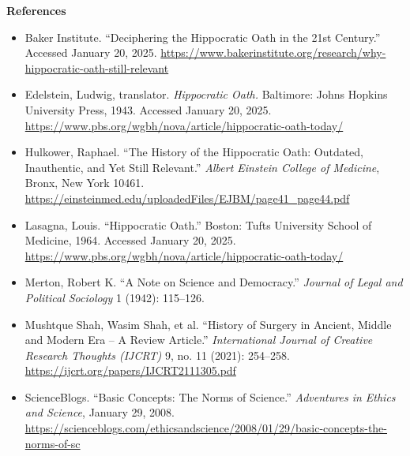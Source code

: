 \documentclass[12pt]{article}
\begin{document}
\bigskip
\begin{center}
\textbf{References}
\end{center}

\begin{itemize}
    \setlength\itemsep{0.5em}
    \item Baker Institute. ``Deciphering the Hippocratic Oath in the 21st Century.'' Accessed January 20, 2025. 
    \url{https://www.bakerinstitute.org/research/why-hippocratic-oath-still-relevant}

    \item Edelstein, Ludwig, translator. \textit{Hippocratic Oath.} Baltimore: Johns Hopkins University Press, 1943. 
    Accessed January 20, 2025. 
    \url{https://www.pbs.org/wgbh/nova/article/hippocratic-oath-today/}

    \item Hulkower, Raphael. ``The History of the Hippocratic Oath: Outdated, Inauthentic, and Yet Still Relevant.'' 
    \textit{Albert Einstein College of Medicine}, Bronx, New York 10461. 
    \url{https://einsteinmed.edu/uploadedFiles/EJBM/page41_page44.pdf} 

    \item Lasagna, Louis. ``Hippocratic Oath.'' Boston: Tufts University School of Medicine, 1964. 
    Accessed January 20, 2025. 
    \url{https://www.pbs.org/wgbh/nova/article/hippocratic-oath-today/}

    \item Merton, Robert K. ``A Note on Science and Democracy.'' \textit{Journal of Legal and Political Sociology} 1 (1942): 115--126.

    \item Mushtque Shah, Wasim Shah, et al. ``History of Surgery in Ancient, Middle and Modern Era -- A Review Article.'' 
    \textit{International Journal of Creative Research Thoughts (IJCRT)} 9, no. 11 (2021): 254--258. 
    \url{https://ijcrt.org/papers/IJCRT2111305.pdf}

    \item ScienceBlogs. ``Basic Concepts: The Norms of Science.'' \textit{Adventures in Ethics and Science}, January 29, 2008. 
    \url{https://scienceblogs.com/ethicsandscience/2008/01/29/basic-concepts-the-norms-of-sc}

\end{itemize}
\end{document}
